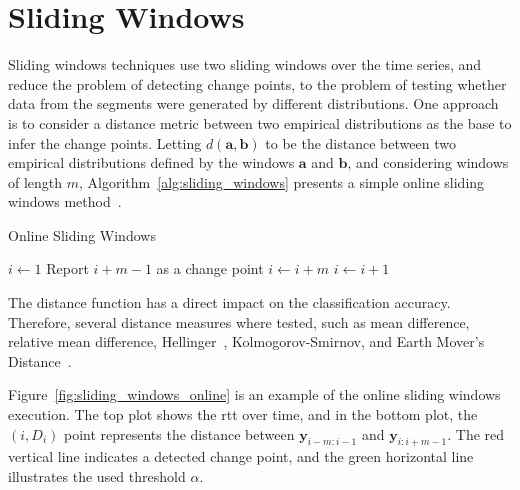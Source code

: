 \section{Sliding Windows}

Sliding windows techniques use two sliding windows over the time series, and
reduce the problem of detecting change points, to the problem of testing whether
data from the segments were generated by different distributions. One approach
is to consider a distance metric between two empirical distributions as the base
to infer the change points. Letting $d(\mathbf{a}, \mathbf{b})$ to be the
distance
between two empirical distributions defined by the windows $\mathbf{a}$ and
$\mathbf{b}$, and considering windows of length $m$,
Algorithm~\ref{alg:sliding_windows} presents a simple online sliding windows
method~\cite{detecting_change_in_data_streams}.

\begin{algorithm}[H]
\caption{Online Sliding Windows}
\label{alg:sliding_windows}
    \begin{algorithmic}[1]
        \State{} $i \gets 1$
                \State{} Report $i + m - 1$ as a change point
                \State{} $i \gets i + m$
             \Else{}
                \State{} $i \gets i + 1$
             \EndIf{}
        \EndWhile{}
    \end{algorithmic}
\end{algorithm}

The distance
function has a direct impact on the classification accuracy.
Therefore, several
distance measures where tested, such as mean difference, relative mean
difference,
Hellinger~\cite{hellinger_distance}, Kolmogorov-Smirnov, and
Earth Mover's
Distance~\cite{the_earth_movers_distance_as_a_metric_for_image_retrieval}.

Figure~\ref{fig:sliding_windows_online} is an example of the online sliding
windows execution. The top plot
shows the \gls*{rtt} over time, and in
the bottom plot, the $(i, D_{i})$ point represents the distance between
$\mathbf{y}_{i - m : i - 1}$ and $\mathbf{y}_{i : i + m - 1}$. The red vertical
line indicates a detected change point, and the green horizontal line
illustrates the used threshold $\alpha$.

